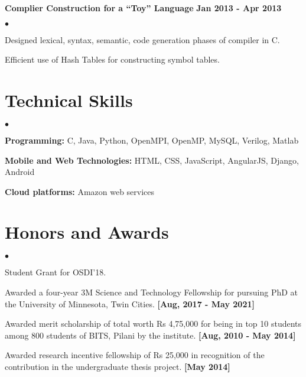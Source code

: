 \documentclass[margin,line]{res}
\newenvironment{list2}{
  \begin{list}{$\bullet$}{%
      \setlength{\itemsep}{0in}
      \setlength{\parsep}{0in} \setlength{\parskip}{0in}
      \setlength{\topsep}{0in} \setlength{\partopsep}{0in} 
      \setlength{\leftmargin}{0.2in}}}{\end{list}}
\begin{document}
\begin{resume}
{\bf Complier Construction for a “Toy” Language} \hfill {\bf Jan 2013 - Apr 2013}\\

\vspace{-.3cm}
\begin{list2}
\item Designed lexical, syntax, semantic, code generation phases of compiler in C.
\item Efficient use of Hash Tables for constructing symbol tables.
\end{list2}

%




\section{\sc Technical Skills} 
\begin{list2}

\item {\bf Programming:} C, Java, Python, OpenMPI, OpenMP, MySQL, Verilog, Matlab
\item {\bf Mobile and Web Technologies:} HTML, CSS, JavaScript, AngularJS, Django, Android
\item {\bf Cloud platforms:} Amazon web services
\end{list2}
 

\section{\sc Honors and Awards}
\begin{list2}
\item Student Grant for OSDI'18.
\item Awarded a four-year 3M Science and Technology Fellowship for pursuing PhD at the University of Minnesota, Twin Cities. {\bf [Aug, 2017 - May 2021]}
\item Awarded merit scholarship of total worth Rs 4,75,000 for being in top 10 students among 800 students of BITS, Pilani by the institute. {\bf [Aug, 2010 - May 2014]}

\item Awarded research incentive fellowship of Rs 25,000 in recognition of the contribution in the
undergraduate thesis project. {\bf [May 2014]}

\end{list2}

\end{resume}
\end{document}
